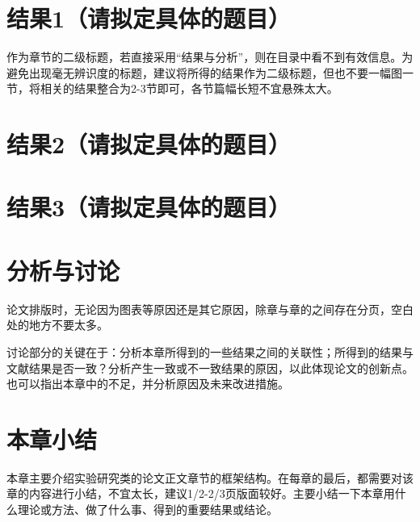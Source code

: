 \section{结果1（请拟定具体的题目）}
作为章节的二级标题，若直接采用“结果与分析”，则在目录中看不到有效信息。为避免出现毫无辨识度的标题，建议将所得的结果作为二级标题，但也不要一幅图一节，将相关的结果整合为2-3节即可，各节篇幅长短不宜悬殊太大。

\section{结果2（请拟定具体的题目）}

\section{结果3（请拟定具体的题目）}

\section{分析与讨论}
论文排版时，无论因为图表等原因还是其它原因，除章与章的之间存在分页，空白处的地方不要太多。

讨论部分的关键在于：分析本章所得到的一些结果之间的关联性；所得到的结果与文献结果是否一致？分析产生一致或不一致结果的原因，以此体现论文的创新点。也可以指出本章中的不足，并分析原因及未来改进措施。

\section{本章小结}
本章主要介绍实验研究类的论文正文章节的框架结构。在每章的最后，都需要对该章的内容进行小结，不宜太长，建议1/2-2/3页版面较好。主要小结一下本章用什么理论或方法、做了什么事、得到的重要结果或结论。


